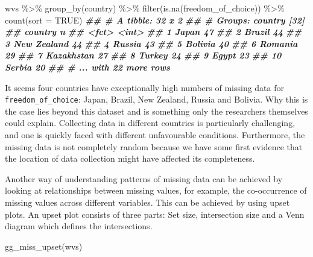 \documentclass[
]{book}
\newenvironment{Shaded}{\begin{snugshade}}{\end{snugshade}}
\newcommand{\AttributeTok}[1]{\textcolor[rgb]{0.77,0.63,0.00}{#1}}
\newcommand{\ConstantTok}[1]{\textcolor[rgb]{0.00,0.00,0.00}{#1}}
\newcommand{\DocumentationTok}[1]{\textcolor[rgb]{0.56,0.35,0.01}{\textbf{\textit{#1}}}}
\newcommand{\FunctionTok}[1]{\textcolor[rgb]{0.00,0.00,0.00}{#1}}
\newcommand{\NormalTok}[1]{#1}
\newcommand{\SpecialCharTok}[1]{\textcolor[rgb]{0.00,0.00,0.00}{#1}}
\begin{document}
\begin{Shaded}
\begin{Highlighting}[]
\NormalTok{wvs }\SpecialCharTok{\%\textgreater{}\%}
  \FunctionTok{group\_by}\NormalTok{(country) }\SpecialCharTok{\%\textgreater{}\%}
  \FunctionTok{filter}\NormalTok{(}\FunctionTok{is.na}\NormalTok{(freedom\_of\_choice)) }\SpecialCharTok{\%\textgreater{}\%}
  \FunctionTok{count}\NormalTok{(}\AttributeTok{sort =} \ConstantTok{TRUE}\NormalTok{)}
\DocumentationTok{\#\# \# A tibble: 32 x 2}
\DocumentationTok{\#\# \# Groups:   country [32]}
\DocumentationTok{\#\#    country         n}
\DocumentationTok{\#\#    \textless{}fct\textgreater{}       \textless{}int\textgreater{}}
\DocumentationTok{\#\#  1 Japan          47}
\DocumentationTok{\#\#  2 Brazil         44}
\DocumentationTok{\#\#  3 New Zealand    44}
\DocumentationTok{\#\#  4 Russia         43}
\DocumentationTok{\#\#  5 Bolivia        40}
\DocumentationTok{\#\#  6 Romania        29}
\DocumentationTok{\#\#  7 Kazakhstan     27}
\DocumentationTok{\#\#  8 Turkey         24}
\DocumentationTok{\#\#  9 Egypt          23}
\DocumentationTok{\#\# 10 Serbia         20}
\DocumentationTok{\#\# \# ... with 22 more rows}
\end{Highlighting}
\end{Shaded}

It seems four countries have exceptionally high numbers of missing data for \texttt{freedom\_of\_choice}: Japan, Brazil, New Zealand, Russia and Bolivia. Why this is the case lies beyond this dataset and is something only the researchers themselves could explain. Collecting data in different countries is particularly challenging, and one is quickly faced with different unfavourable conditions. Furthermore, the missing data is not completely random because we have some first evidence that the location of data collection might have affected its completeness.

Another way of understanding patterns of missing data can be achieved by looking at relationships between missing values, for example, the co-occurrence of missing values across different variables. This can be achieved by using upset plots. An upset plot consists of three parts: Set size, intersection size and a Venn diagram which defines the intersections.

\begin{Shaded}
\begin{Highlighting}[]
\FunctionTok{gg\_miss\_upset}\NormalTok{(wvs)}
\end{Highlighting}
\end{Shaded}
\end{document}
